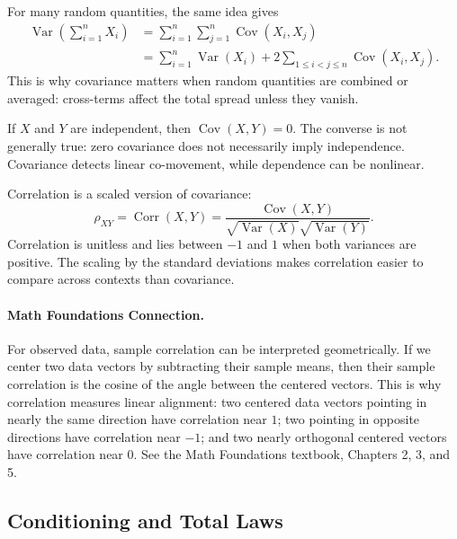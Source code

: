 {For many random quantities, the same idea gives
\begin{equation}
\begin{aligned}
  \operatorname{Var}\!\left(\sum_{i=1}^n X_i\right)
  &=
  \sum_{i=1}^n\sum_{j=1}^n \operatorname{Cov}(X_i,X_j) \\
  &=
  \sum_{i=1}^n \operatorname{Var}(X_i)
  +
  2\sum_{1\leq i<j\leq n}\operatorname{Cov}(X_i,X_j).
\end{aligned}
  \label{eq:variance-general-sum}
\end{equation}
This is why covariance matters when random quantities are combined or averaged: cross-terms affect the total spread unless they vanish.

If $X$ and $Y$ are independent, then $\operatorname{Cov}(X,Y)=0$.  The converse is not generally true: zero covariance does not necessarily imply independence.  Covariance detects linear co-movement, while dependence can be nonlinear.

Correlation is a scaled version of covariance:
\begin{equation}
  \rho_{XY}
  = \operatorname{Corr}(X,Y)
  = \frac{\operatorname{Cov}(X,Y)}{\sqrt{\operatorname{Var}(X)}\sqrt{\operatorname{Var}(Y)}}.
  \label{eq:correlation-definition}
\end{equation}
Correlation is unitless and lies between $-1$ and $1$ when both variances are positive.  The scaling by the standard deviations makes correlation easier to compare across contexts than covariance.

\paragraph{Math Foundations Connection.}
For observed data, sample correlation can be interpreted geometrically.  If we center two data vectors by subtracting their sample means, then their sample correlation is the cosine of the angle between the centered vectors.  This is why correlation measures linear alignment: two centered data vectors pointing in nearly the same direction have correlation near $1$; two pointing in opposite directions have correlation near $-1$; and two nearly orthogonal centered vectors have correlation near $0$.  See the Math Foundations textbook, Chapters 2, 3, and 5.

\subsection{Conditioning and Total Laws}

}
